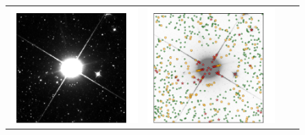 \documentclass[12pt,preprint]{aastex}
\begin{document}
\begin{figure}
\begin{center}
\begin{tabular}{@{}c@{\spc}c@{\spc}c@{\spc}c@{}}
      \includegraphics[width=\figw]{bright-08} &
      \includegraphics[width=\figw]{bright-09} &

\end{tabular}
\end{center}
\end{figure}
\end{document}
